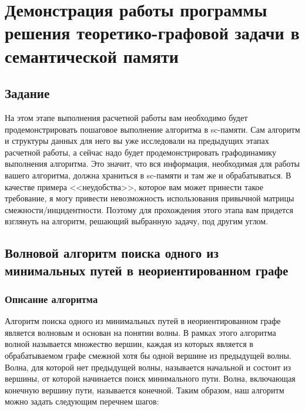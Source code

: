\chapter{Демонстрация работы программы решения теоретико-графовой
  задачи в семантической памяти}

\section{Задание}

На этом этапе выполнения расчетной работы вам необходимо будет
продемонстрировать пошаговое выполнение алгоритма в sc-памяти. Сам
алгоритм и структуры данных для него вы уже исследовали на предыдущих
этапах расчетной работы, а сейчас надо будет продемонстрировать
графодинамику выполнения алгоритма. Это значит, что вся информация,
необходимая для работы вашего алгоритма, должна храниться в sc-памяти
и там же и обрабатываться. В качестве примера <<неудобства>>, которое
вам может принести такое требование, я могу привести невозможность
использования привычной матрицы смежности/инцидентности.  Поэтому для
прохождения этого этапа вам придется взглянуть на алгоритм, решающий
выбранную задачу, под другим углом.

\section{Волновой алгоритм поиска одного из минимальных путей в
  неориентированном графе}

\subsection{Описание алгоритма}
\label{sec:-Algo_desc}

Алгоритм поиска одного из минимальных путей в неориентированном графе
является волновым и основан на понятии волны. В рамках этого алгоритма
волной называется множество вершин, каждая из которых является в
обрабатываемом графе смежной хотя бы одной вершине из предыдущей
волны. Волна, для которой нет предыдущей волны, называется начальной и
состоит из вершины, от которой начинается поиск минимального
пути. Волна, включающая конечную вершину пути, называется
конечной. Таким образом, наш алгоритм можно задать следующим перечнем
шагов:

